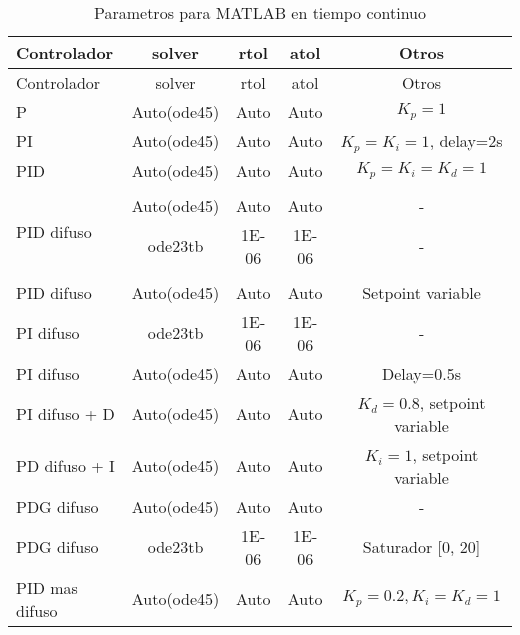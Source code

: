         {\setlength\LTleft{0pt}
        \setlength\LTright{0pt}
        \centering
        \footnotesize
        \renewcommand{\arraystretch}{0.89}
        \begin{longtable}{l @{\extracolsep{\fill}} cccc}
        \caption[Parametros para MATLAB en tiempo continuo]{Parametros para MATLAB en tiempo continuo} 
        \label{tab:parametrosMATLABc} \\
        \toprule
        Controlador  & solver & rtol & atol & Otros       \\ \midrule
        \endfirsthead
        \toprule
        Controlador  & solver & rtol & atol & Otros       \\ \midrule
        \endhead
        \bottomrule
        \endfoot
         P                          & Auto(ode45)   &     Auto      & Auto          & $K_p=1$                       \\
         PI                         & Auto(ode45)   &     Auto      & Auto          & $K_p=K_i=1$, delay=2s         \\
         PID                        & Auto(ode45)   &     Auto      & Auto          & $K_p=K_i=K_d=1$               \\
         &&&& \\[-3pt]        
         \multirow{2}{*}{PID difuso}& Auto(ode45)   &     Auto      & Auto          & -                             \\
                                    & ode23tb       & \num{1E-06}   & \num{1E-06}   & -                             \\
         &&&& \\[-3pt]  
         PID difuso                 & Auto(ode45)   & Auto          & Auto          & Setpoint variable             \\
         PI difuso                  & ode23tb       & \num{1E-06}   & \num{1E-06}   & -                             \\
         PI difuso                  & Auto(ode45)   & Auto          & Auto          & Delay=0.5s                    \\
         PI difuso + D              & Auto(ode45)   & Auto          & Auto          & $K_d=0.8$, setpoint variable  \\
         PD difuso + I              & Auto(ode45)   & Auto          & Auto          & $K_i=1$, setpoint variable    \\
         PDG difuso                 & Auto(ode45)   & Auto          & Auto          & -                             \\
         PDG difuso                 & ode23tb       & \num{1E-06}   & \num{1E-06}   & Saturador [0, 20]             \\
         PID mas difuso             & Auto(ode45)   & Auto          & Auto          & $K_p=0.2, K_i=K_d=1$          \\
        \end{longtable}}


